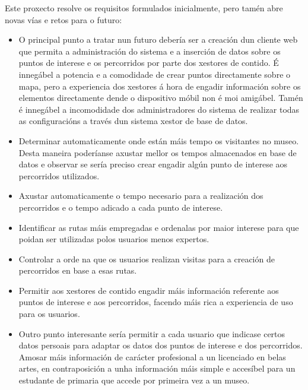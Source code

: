 Este proxecto resolve os requisitos formulados inicialmente, pero tamén abre novas vías e retos para o futuro:

\begin{itemize}
	\item O principal punto a tratar nun futuro debería ser a creación dun cliente web que permita a administración do sistema e a inserción de datos sobre os puntos de interese e os percorridos por parte dos xestores de contido. É innegábel a potencia e a comodidade de crear puntos directamente sobre o mapa, pero a experiencia dos xestores á hora de engadir información sobre os elementos directamente dende o dispositivo móbil non é moi amigábel. Tamén é innegábel a incomodidade dos administradores do sistema de realizar todas as configuracións a través dun sistema xestor de base de datos.
	\item Determinar automaticamente onde están máis tempo os visitantes no museo. Desta maneira poderíanse axustar mellor os tempos almacenados en base de datos e observar se sería preciso crear engadir algún punto de interese aos percorridos utilizados.
	\item Axustar automaticamente o tempo necesario para a realización dos percorridos e o tempo adicado a cada punto de interese.
	\item Identificar as rutas máis empregadas e ordenalas por maior interese para que poidan ser utilizadas polos usuarios menos expertos.
	\item Controlar a orde na que os usuarios realizan visitas para a creación de percorridos en base a esas rutas.
	\item Permitir aos xestores de contido engadir máis información referente aos puntos de interese e aos percorridos, facendo máis rica a experiencia de uso para os usuarios.
	\item Outro punto interesante sería permitir a cada usuario que indicase certos datos persoais para adaptar os datos dos puntos de interese e dos percorridos. Amosar máis información de carácter profesional a un licenciado en belas artes, en contraposición a unha información máis simple e accesíbel para un estudante de primaria que accede por primeira vez a un museo.
\end{itemize}
